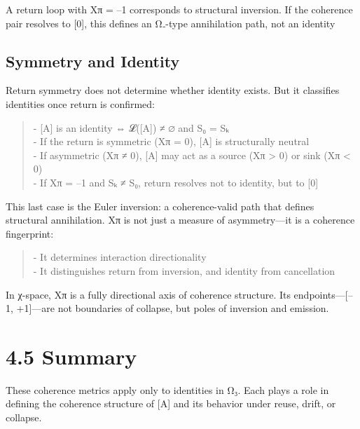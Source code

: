 A return loop with Xπ = --1 corresponds to structural inversion. If the
coherence pair resolves to {[}0{]}, this defines an Ω₋-type annihilation
path, not an identity

\subsection{Symmetry and Identity}\label{symmetry-and-identity}

Return symmetry does not determine whether identity exists. But it
classifies identities once return is confirmed:

\begin{quote}
- {[}A{]} is an identity ⇔ 𝓛({[}A{]}) ≠ ∅ and S₀ = Sₖ\\
- If the return is symmetric (Xπ = 0), {[}A{]} is structurally neutral\\
- If asymmetric (Xπ ≠ 0), {[}A{]} may act as a source (Xπ \textgreater{}
0) or sink (Xπ \textless{} 0)\\
- If Xπ = --1 and Sₖ ≠ S₀, return resolves not to identity, but to
{[}0{]}
\end{quote}

This last case is the Euler inversion: a coherence-valid path that
defines structural annihilation. Xπ is not just a measure of
asymmetry---it is a coherence fingerprint:

\begin{quote}
- It determines interaction directionality\\
- It distinguishes return from inversion, and identity from cancellation
\end{quote}

In χ-space, Xπ is a fully directional axis of coherence structure. Its
endpoints---{[}--1, +1{]}---are not boundaries of collapse, but poles of
inversion and emission.

\section{4.5 \textbar{} Summary}\label{summary-2}

These coherence metrics apply only to identities in Ω₃. Each plays a
role in defining the coherence structure of {[}A{]} and its behavior
under reuse, drift, or collapse.

